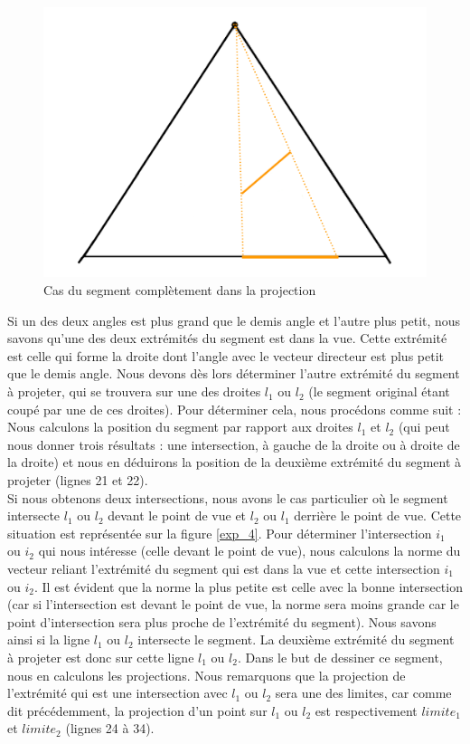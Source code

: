 \documentclass[11pt,a4paper]{article}
\theoremstyle{definition}
\theoremstyle{remark}
\begin{document}
\begin{figure}[H]
\centering
\includegraphics[scale=0.5]{cas1.png}
\caption{Cas du segment complètement dans la projection}
\label{cas1}
\end{figure}

Si un des deux angles est plus grand que le demis angle et l'autre plus petit, nous savons qu'une des deux extrémités du segment est dans la vue. Cette extrémité est celle qui forme la droite dont l'angle avec le vecteur directeur est plus petit que le demis angle. Nous devons dès lors déterminer l'autre extrémité du segment à projeter, qui se trouvera sur une des droites $l_1$ ou $l_2$ (le segment original étant coupé par une de ces droites). Pour déterminer cela, nous procédons comme suit :\\

Nous calculons la position du segment par rapport aux droites $l_1$ et $l_2$ (qui peut nous donner trois résultats : une intersection, à gauche de la droite ou à droite de la droite) et nous en déduirons la position de la deuxième extrémité du segment à projeter (lignes 21 et 22). \\

Si nous obtenons deux intersections, nous avons le cas particulier où le segment intersecte $l_1$ ou $l_2$ devant le point de vue et $l_2$ ou $l_1$ derrière le point de vue. Cette situation est représentée sur la figure \ref{exp_4}. Pour déterminer l'intersection $i_1$ ou $i_2$ qui nous intéresse (celle devant le point de vue), nous calculons la norme du vecteur reliant l'extrémité du segment qui est dans la vue et cette intersection $i_1$ ou $i_2$. Il est évident que la norme la plus petite est celle avec la bonne intersection (car si l'intersection est devant le point de vue, la norme sera moins grande car le point d'intersection sera plus proche de l'extrémité du segment). Nous savons ainsi si la ligne $l_1$ ou $l_2$ intersecte le segment. La deuxième extrémité du segment à projeter est donc sur cette ligne $l_1$ ou $l_2$. Dans le but de dessiner ce segment, nous en calculons les projections. Nous remarquons que la projection de l'extrémité qui est une intersection avec $l_1$ ou $l_2$ sera une des limites, car comme dit précédemment, la projection d'un point sur $l_1$ ou $l_2$ est respectivement $limite_1$ et $limite_2$ (lignes 24 à 34).\\
\end{document}
